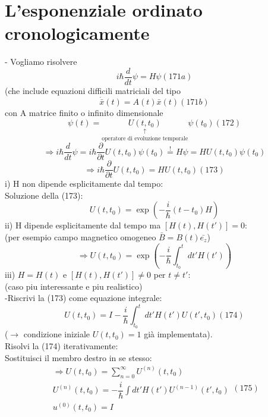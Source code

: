 \documentclass[a4paper,11pt]{report}
\newcommand{\x}{\bar{x}}
\begin{document}
\section{L'esponenziale ordinato cronologicamente}
- Vogliamo risolvere 
\begin{equation}
i\hbar \dfrac{d}{dt}\psi = H \psi (171a)
\end{equation}
(che include equazioni difficili matriciali del tipo 
\begin{equation}
\dot{\x}(t)=A(t)\x(t) (171b)
\end{equation}
con A matrice finito o infinito dimensionale
\begin{equation}
\psi(t)=\underset{\text{operatore di evoluzione temporale}}{\underset{\uparrow}{U(t,t_0)}}\psi(t_0) (172)
\end{equation}
$$
\Rightarrow i\hbar \dfrac{d}{dt}\psi = i\hbar \dfrac{\partial}{\partial t}U(t,t_0)\psi(t_0)\overset{!}{=}H\psi = HU(t,t_0)\psi(t_0)
$$
\begin{equation}
\Rightarrow i\hbar \dfrac{\partial }{\partial t}U(t,t_0)=HU(t,t_0) (173)
\end{equation}
i) H non dipende esplicitamente dal tempo: \\
Soluzione della (173):
$$
U(t,t_0)=\exp \left(-\dfrac{i}{\hbar}(t-t_0)H\right)
$$
ii) H dipende esplicitamente dal tempo ma $[H(t),H(t')]=0$:\\
(per esempio campo magnetico omogeneo $\bar{B}=B(t)\bar{e_z}$)
$$
\Rightarrow U(t,t_0)=\exp \left(-\dfrac{i}{\hbar}\int_{t_0}^t dt' H(t')\right)
$$
iii) $H=H(t)$ e $[H(t),H(t')]\neq 0$ per $t\neq t'$:\\
(caso piu interessante e piu realistico)\\
-Riscrivi la (173) come equazione integrale:
\begin{equation}
U(t,t_0) = I - \dfrac{i}{\hbar}\int_{t_0}^t dt' H(t')U(t',t_0) (174)
\end{equation}
($\rightarrow$ condizione iniziale $U(t,t_0)=1$ già implementata).\\
Risolvi la (174) iterativamente: \\
Sostituisci il membro destro in se stesso:
\begin{equation}
\begin{matrix}
\Rightarrow U(t,t_0)=\sum_{n=0}^\infty U^{(n)}(t,t_0)\\
U^{(n)}(t,t_0)=-\dfrac{i}{\hbar}\int dt' H(t') U^{(n-1)}(t',t_0)\\
u^{(0)}(t,t_0)=I
\end{matrix} (175)
\end{equation}
\end{document}
